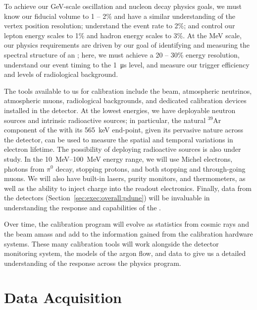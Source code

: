 To achieve our \si{\giga\electronvolt}-scale oscillation and nucleon decay physics goals, we must know our fiducial volume to 1 -- 2\% and have a similar understanding of the vertex position resolution; understand the \nue event rate to 2\%; and control our lepton energy scales to 1\% and hadron energy scales to 3\%. At the \si{\mega\electronvolt} scale, our physics requirements are driven by our goal of identifying and measuring the spectral structure of an ; here, we must achieve a 20 -- 30\% energy resolution, understand our event timing to the \SI{1}{\micro\second} level, and measure our trigger efficiency and levels of radiological background. 

The tools available to us for calibration include the  beam, atmospheric neutrinos, atmospheric muons, radiological backgrounds, and dedicated calibration devices installed in the detector. At the lowest energies, we have deployable neutron sources and intrinsic radioactive sources; in particular, the natural $^{39}$Ar component of the  with its \SI{565}{\kilo\electronvolt} end-point, given its pervasive nature across the detector, can be used to measure the spatial and temporal variations in electron lifetime. The possibility of deploying radioactive sources is also under study. %
In the \SIrange{10}{100}{\mega\electronvolt} energy range, we will use Michel electrons, photons from $\pi^{0}$ decay, stopping protons, and both stopping and through-going muons. We will also have built-in lasers, purity monitors, and thermometers, as well as the ability to inject charge into the readout electronics. Finally, data from the  detectors  (Section~\ref{sec:exec:overall:pdune}) will be invaluable in understanding the response and  capabilities of the .

Over time, the  calibration program will evolve as statistics from cosmic rays and the  beam amass and add to the information gained from the calibration hardware systems. These many calibration tools will work alongside the detector monitoring system, the  models of the argon flow, and  data to give us a detailed understanding of the  response across the  physics program.

\section{Data Acquisition}
\label{sec:exec-sp-daq}

